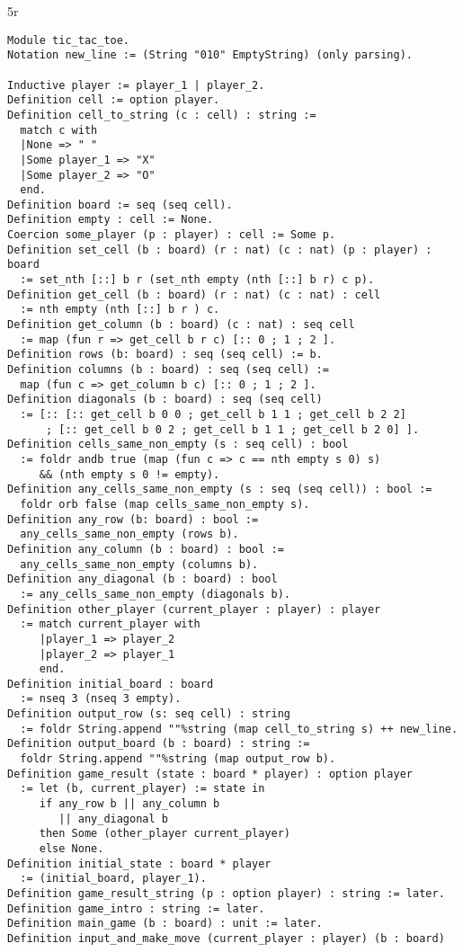 5r\documentclass{article}
\theoremstyle{definition}
\begin{document}
\begin{verbatim}
Module tic_tac_toe.
Notation new_line := (String "010" EmptyString) (only parsing).

Inductive player := player_1 | player_2.
Definition cell := option player.
Definition cell_to_string (c : cell) : string := 
  match c with
  |None => " "
  |Some player_1 => "X"
  |Some player_2 => "O"
  end.
Definition board := seq (seq cell).
Definition empty : cell := None.
Coercion some_player (p : player) : cell := Some p.
Definition set_cell (b : board) (r : nat) (c : nat) (p : player) : board 
  := set_nth [::] b r (set_nth empty (nth [::] b r) c p).
Definition get_cell (b : board) (r : nat) (c : nat) : cell 
  := nth empty (nth [::] b r ) c.
Definition get_column (b : board) (c : nat) : seq cell 
  := map (fun r => get_cell b r c) [:: 0 ; 1 ; 2 ].
Definition rows (b: board) : seq (seq cell) := b.
Definition columns (b : board) : seq (seq cell) := 
  map (fun c => get_column b c) [:: 0 ; 1 ; 2 ].
Definition diagonals (b : board) : seq (seq cell) 
  := [:: [:: get_cell b 0 0 ; get_cell b 1 1 ; get_cell b 2 2] 
      ; [:: get_cell b 0 2 ; get_cell b 1 1 ; get_cell b 2 0] ].
Definition cells_same_non_empty (s : seq cell) : bool 
  := foldr andb true (map (fun c => c == nth empty s 0) s)
     && (nth empty s 0 != empty).
Definition any_cells_same_non_empty (s : seq (seq cell)) : bool := 
  foldr orb false (map cells_same_non_empty s).
Definition any_row (b: board) : bool := 
  any_cells_same_non_empty (rows b).
Definition any_column (b : board) : bool := 
  any_cells_same_non_empty (columns b).
Definition any_diagonal (b : board) : bool 
  := any_cells_same_non_empty (diagonals b).
Definition other_player (current_player : player) : player 
  := match current_player with
     |player_1 => player_2
     |player_2 => player_1
     end.
Definition initial_board : board 
  := nseq 3 (nseq 3 empty).
Definition output_row (s: seq cell) : string 
  := foldr String.append ""%string (map cell_to_string s) ++ new_line.
Definition output_board (b : board) : string := 
  foldr String.append ""%string (map output_row b).
Definition game_result (state : board * player) : option player
  := let (b, current_player) := state in
     if any_row b || any_column b 
        || any_diagonal b
     then Some (other_player current_player)
     else None.
Definition initial_state : board * player 
  := (initial_board, player_1).
Definition game_result_string (p : option player) : string := later.
Definition game_intro : string := later.
Definition main_game (b : board) : unit := later.
Definition input_and_make_move (current_player : player) (b : board)

\end{verbatim}
\end{document}
